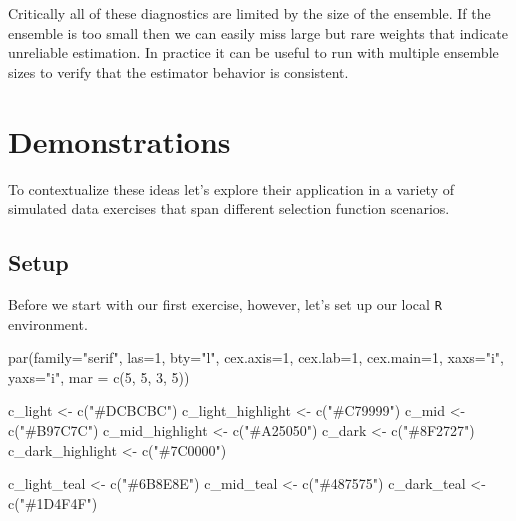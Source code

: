 \documentclass[
  letterpaper,
  DIV=11,
  numbers=noendperiod]{scrartcl}
\newenvironment{Shaded}{\begin{snugshade}}{\end{snugshade}}
\newcommand{\AttributeTok}[1]{\textcolor[rgb]{0.40,0.45,0.13}{#1}}
\newcommand{\DecValTok}[1]{\textcolor[rgb]{0.68,0.00,0.00}{#1}}
\newcommand{\FunctionTok}[1]{\textcolor[rgb]{0.28,0.35,0.67}{#1}}
\newcommand{\NormalTok}[1]{\textcolor[rgb]{0.00,0.23,0.31}{#1}}
\newcommand{\OtherTok}[1]{\textcolor[rgb]{0.00,0.23,0.31}{#1}}
\newcommand{\StringTok}[1]{\textcolor[rgb]{0.13,0.47,0.30}{#1}}
\begin{document}
Critically all of these diagnostics are limited by the size of the
ensemble. If the ensemble is too small then we can easily miss large but
rare weights that indicate unreliable estimation. In practice it can be
useful to run with multiple ensemble sizes to verify that the estimator
behavior is consistent.

\section{Demonstrations}\label{sec:demonstrations}

To contextualize these ideas let's explore their application in a
variety of simulated data exercises that span different selection
function scenarios.

\subsection{Setup}\label{setup}

Before we start with our first exercise, however, let's set up our local
\texttt{R} environment.

\begin{Shaded}
\begin{Highlighting}[]
\FunctionTok{par}\NormalTok{(}\AttributeTok{family=}\StringTok{"serif"}\NormalTok{, }\AttributeTok{las=}\DecValTok{1}\NormalTok{, }\AttributeTok{bty=}\StringTok{"l"}\NormalTok{,}
    \AttributeTok{cex.axis=}\DecValTok{1}\NormalTok{, }\AttributeTok{cex.lab=}\DecValTok{1}\NormalTok{, }\AttributeTok{cex.main=}\DecValTok{1}\NormalTok{,}
    \AttributeTok{xaxs=}\StringTok{"i"}\NormalTok{, }\AttributeTok{yaxs=}\StringTok{"i"}\NormalTok{, }\AttributeTok{mar =} \FunctionTok{c}\NormalTok{(}\DecValTok{5}\NormalTok{, }\DecValTok{5}\NormalTok{, }\DecValTok{3}\NormalTok{, }\DecValTok{5}\NormalTok{))}

\NormalTok{c\_light }\OtherTok{\textless{}{-}} \FunctionTok{c}\NormalTok{(}\StringTok{"\#DCBCBC"}\NormalTok{)}
\NormalTok{c\_light\_highlight }\OtherTok{\textless{}{-}} \FunctionTok{c}\NormalTok{(}\StringTok{"\#C79999"}\NormalTok{)}
\NormalTok{c\_mid }\OtherTok{\textless{}{-}} \FunctionTok{c}\NormalTok{(}\StringTok{"\#B97C7C"}\NormalTok{)}
\NormalTok{c\_mid\_highlight }\OtherTok{\textless{}{-}} \FunctionTok{c}\NormalTok{(}\StringTok{"\#A25050"}\NormalTok{)}
\NormalTok{c\_dark }\OtherTok{\textless{}{-}} \FunctionTok{c}\NormalTok{(}\StringTok{"\#8F2727"}\NormalTok{)}
\NormalTok{c\_dark\_highlight }\OtherTok{\textless{}{-}} \FunctionTok{c}\NormalTok{(}\StringTok{"\#7C0000"}\NormalTok{)}

\NormalTok{c\_light\_teal }\OtherTok{\textless{}{-}} \FunctionTok{c}\NormalTok{(}\StringTok{"\#6B8E8E"}\NormalTok{)}
\NormalTok{c\_mid\_teal }\OtherTok{\textless{}{-}} \FunctionTok{c}\NormalTok{(}\StringTok{"\#487575"}\NormalTok{)}
\NormalTok{c\_dark\_teal }\OtherTok{\textless{}{-}} \FunctionTok{c}\NormalTok{(}\StringTok{"\#1D4F4F"}\NormalTok{)}
\end{Highlighting}
\end{Shaded}
\end{document}
